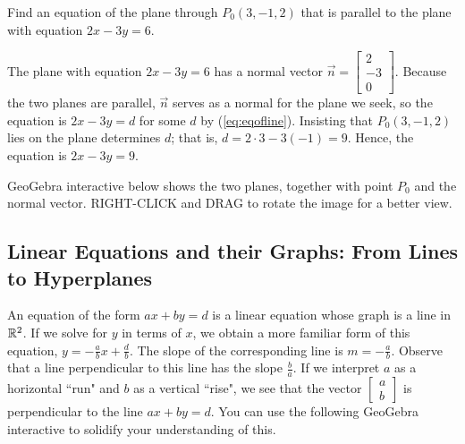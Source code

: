 \documentclass{ximera}
\begin{document}
 
\begin{example}\label{ex:planeparalleltoplane}
Find an equation of the plane through $P_{0}(3, -1, 2)$ that is parallel to the plane with equation $2x - 3y = 6$.
 
\begin{explanation}
The plane with equation $2x -3y = 6$ has a normal vector $\vec{n} =
\begin{bmatrix}
2\\
-3\\
0
\end{bmatrix}$. Because the two planes are parallel, $\vec{n}$ serves as a normal for the plane we seek, so the equation is $2x - 3y = d$ for some $d$ by (\ref{eq:eqofline}). Insisting that $P_{0}(3, -1, 2)$ lies on the plane determines $d$; that is, $d = 2 \cdot 3 - 3(-1) = 9$. Hence, the equation is $2x - 3y = 9$.
 
GeoGebra interactive below shows the two planes, together with point $P_0$ and the normal vector.  RIGHT-CLICK and DRAG to rotate the image for a better view.
 
 
\begin{onlineOnly}
\begin{center}
\end{center}
\end{onlineOnly}
\end{explanation}
\end{example}


 
\subsection*{Linear Equations and their Graphs: From Lines to Hyperplanes}
An equation of the form $ax+by=d$ is a linear equation whose graph is a line in $\mathbb{R}^2$. If we solve for $y$ in terms of $x$, we obtain a more familiar form of this equation, $y=-\frac{a}{b}x+\frac{d}{b}$.  The slope of the corresponding line is $m=-\frac{a}{b}$.  Observe that a line perpendicular to this line has the slope $\frac{b}{a}$.  If we interpret $a$ as a horizontal ``run" and $b$ as a vertical ``rise", we see that the vector $\begin{bmatrix}a\\b\end{bmatrix}$ is perpendicular to the line $ax+by=d$.  You can use the following GeoGebra interactive to solidify your understanding of this.
\end{document}
